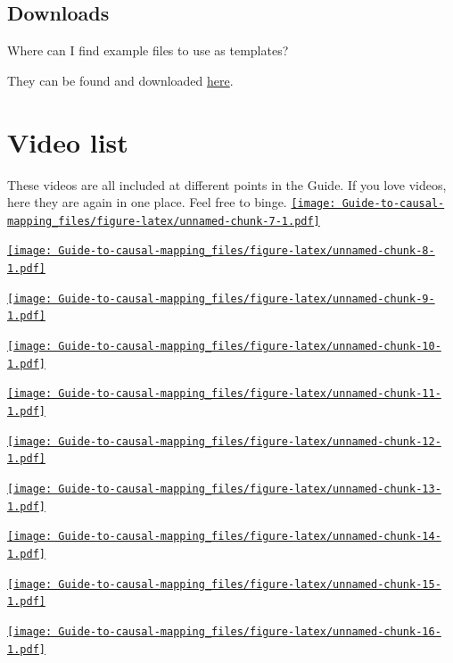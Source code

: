 \documentclass[
]{book}
\begin{document}
\hypertarget{downloads}{%
\section{Downloads}\label{downloads}}

Where can I find example files to use as templates?

They can be found and downloaded \href{https://drive.google.com/drive/folders/1wvifDQ0BXmAjSudTRUv9i_4JURpphD4v}{here}.

\hypertarget{xvideo-list}{%
\chapter{Video list}\label{xvideo-list}}

These videos are all included at different points in the Guide. If you love videos, here they are again in one place. Feel free to binge.
\href{https://player.vimeo.com/video/689223728}{\texttt{[image: Guide-to-causal-mapping\_files/figure-latex/unnamed-chunk-7-1.pdf]}}

\href{https://player.vimeo.com/video/674369121}{\texttt{[image: Guide-to-causal-mapping\_files/figure-latex/unnamed-chunk-8-1.pdf]}}

\href{https://player.vimeo.com/video/641927229}{\texttt{[image: Guide-to-causal-mapping\_files/figure-latex/unnamed-chunk-9-1.pdf]}}

\href{https://player.vimeo.com/video/604099226}{\texttt{[image: Guide-to-causal-mapping\_files/figure-latex/unnamed-chunk-10-1.pdf]}}

\href{https://player.vimeo.com/video/588851236}{\texttt{[image: Guide-to-causal-mapping\_files/figure-latex/unnamed-chunk-11-1.pdf]}}

\href{https://player.vimeo.com/video/588881701}{\texttt{[image: Guide-to-causal-mapping\_files/figure-latex/unnamed-chunk-12-1.pdf]}}

\href{https://player.vimeo.com/video/674383670}{\texttt{[image: Guide-to-causal-mapping\_files/figure-latex/unnamed-chunk-13-1.pdf]}}

\href{https://player.vimeo.com/video/596519456}{\texttt{[image: Guide-to-causal-mapping\_files/figure-latex/unnamed-chunk-14-1.pdf]}}

\href{https://player.vimeo.com/video/618270513}{\texttt{[image: Guide-to-causal-mapping\_files/figure-latex/unnamed-chunk-15-1.pdf]}}

\href{https://player.vimeo.com/video/596594094}{\texttt{[image: Guide-to-causal-mapping\_files/figure-latex/unnamed-chunk-16-1.pdf]}}
\end{document}
